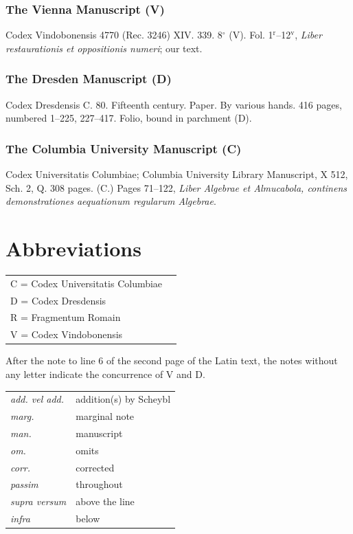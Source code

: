 \documentclass[11pt,a4paper,twoside]{book}
\begin{document}
\section{The Vienna Manuscript (V)}

Codex Vindobonensis 4770 (Rec. 3246) XIV. 339. 8$^\circ$ (V). Fol. 1$^\text{r}$--12$^\text{v}$, \textit{Liber restaurationis et oppositionis numeri}; our text.

\section{The Dresden Manuscript (D)}

Codex Dresdensis C. 80. Fifteenth century. Paper. By various hands. 416 pages, numbered 1--225, 227--417. Folio, bound in parchment (D).

\section{The Columbia University Manuscript (C)}

Codex Universitatis Columbiae; Columbia University Library Manuscript, X 512, Sch. 2, Q. 308 pages. (C.) Pages 71--122, \textit{Liber Algebrae et Almucabola, continens demonstrationes aequationum regularum Algebrae}.

\part*{Abbreviations}

\begin{longtable}{ll}
C = Codex Universitatis Columbiae \\
D = Codex Dresdensis \\
R = Fragmentum Romain \\
V = Codex Vindobonensis \\
\end{longtable}

After the note to line 6 of the second page of the Latin text, the notes without any letter indicate the concurrence of V and D.

\begin{longtable}{ll}
\textit{add. vel add.} & addition(s) by Scheybl \\
\textit{marg.} & marginal note \\
\textit{man.} & manuscript \\
\textit{om.} & omits \\
\textit{corr.} & corrected \\
\textit{passim} & throughout \\
\textit{supra versum} & above the line \\
\textit{infra} & below \\
\end{longtable}
\end{document}
